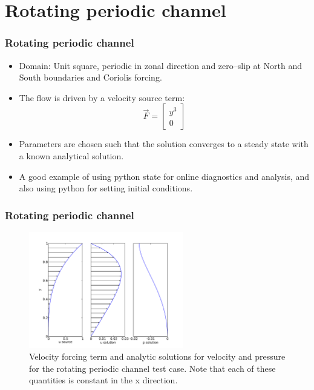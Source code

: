 \section{Rotating periodic channel}

\begin{frame}
    \frametitle{Rotating periodic channel}
\begin{itemize}
\item Domain: Unit square, periodic in zonal direction and zero--slip at North and South boundaries and Coriolis forcing.
\item The flow is driven by a velocity source term:
\begin{equation*}
  \vec{F}=
  \begin{bmatrix}
    y^3 \\
    0
  \end{bmatrix}
\end{equation*}
\item Parameters are chosen such that the solution converges to a steady state with a known analytical solution.
\item A good example of using python state for online diagnostics and analysis, and also using python for setting initial conditions.
\end{itemize}
\end{frame}
%
\begin{frame}
    \frametitle{Rotating periodic channel}
\begin{figure}
\includegraphics[width=0.6\textwidth]{./rotating_channel/analytic_solution}
\caption{Velocity forcing term and analytic solutions for velocity and pressure for the rotating periodic channel test case. Note that each of these quantities is constant in the x direction.}
\end{figure}
\end{frame}
%
